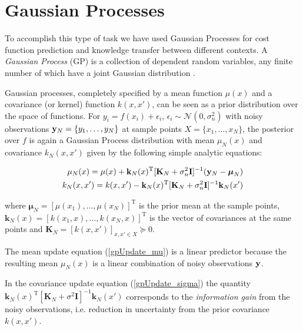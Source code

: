 \section{Gaussian Processes}\label{GPIntro}
To accomplish this type of task we have used Gaussian Processes for cost function prediction and knowledge transfer between different contexts. A \textit{Gaussian Process} (GP) is a collection of dependent random variables, any finite number of which have a joint Gaussian distribution \cite{GPbook}. 

Gaussian processes, completely specified by a mean function $\mu(x)$ and a covariance (or kernel) function $k(x,x')$, can be seen as a prior distribution over the space of functions. For $y_i = f(x_i) + \epsilon_i$, $\epsilon_i \sim \mathcal{N}(0,\sigma_{n}^{2})$ with noisy observations $\mathbf{y}_{N} = \{y_1,\ldots,y_N\}$ at sample points $X = \{x_1,\ldots,x_N\}$, the posterior over $f$ is again a Gaussian Process distribution with mean $\mu_N{(x)}$ and covariance $k_N(x,x')$ given by the following simple analytic equations:

\begin{align}
\mu_N{(x)} = \mu(x) + \mathbf{k}_N(x)^{\mathrm{T}}[\mathbf{K}_N + \sigma_{n}^{2}\mathbf{I}]^{-1}(\mathbf{y}_N - \boldsymbol{\mu}_N) \label{gpUpdate_mu} \\ 
k_N(x,x') = k(x,x') - \mathbf{k}_N(x)^{\mathrm{T}}[\mathbf{K}_N + \sigma_{n}^{2}\mathbf{I}]^{-1} \mathbf{k}_N(x') \label{gpUpdate_sigma}
\end{align}

where $\boldsymbol{\mu}_N = [\mu(x_1),\ldots,\mu(x_N)]^\mathrm{T}$ is the prior mean at the sample points,  \\ $\mathbf{k}_N(x) = [k(x_1,x),\ldots,k(x_N,x)]^\mathrm{T}$ is the vector of covariances at the same points and $\mathbf{K}_N = [k(x,x')]_{x,x' \in X} \succeq 0.$

The mean update equation (\ref{gpUpdate_mu}) is a linear predictor because the resulting mean $\mu_N{(x)}$ is a linear combination of noisy observations $\mathbf{y}$. 	

In the covariance update equation (\ref{gpUpdate_sigma}) the quantity $\mathbf{k}_N(x)^{\mathrm{T}}[\mathbf{K}_N + \sigma^{2}\mathbf{I}]^{-1} \mathbf{k}_N(x')$ corresponds to the \emph{information gain} from the noisy observations, i.e. reduction in uncertainty from the prior covariance $k(x,x')$.

